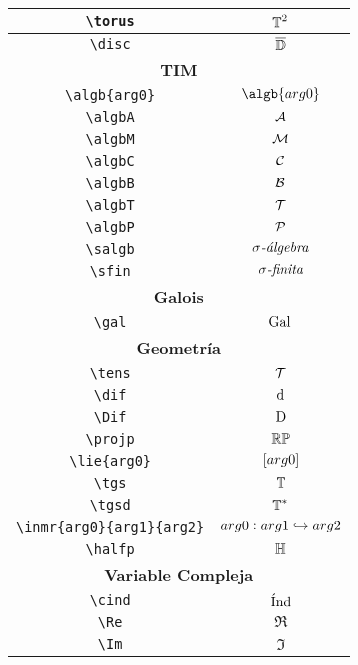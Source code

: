 \begin{longtable}{|c|c|}
\verb|\torus| & $\displaystyle\mathbb{T}^2$ \\ \midrule 
\verb|\disc| & $\displaystyle\overline{\mathbb{D}}$ \\ \midrule 
\bottomrule \multicolumn{2}{|c|}{\textbf{TIM}} \\ \toprule 
\verb|\algb{arg0}| & $\displaystyle\algb{arg0}$ \\ \midrule 
\verb|\algbA| & $\displaystyle\mathcal{A}$ \\ \midrule 
\verb|\algbM| & $\displaystyle\mathcal{M}$ \\ \midrule 
\verb|\algbC| & $\displaystyle\mathcal{C}$ \\ \midrule 
\verb|\algbB| & $\displaystyle\mathcal{B}$ \\ \midrule 
\verb|\algbT| & $\displaystyle\mathcal{T}$ \\ \midrule 
\verb|\algbP| & $\displaystyle\mathcal{P}$ \\ \midrule 
\verb|\salgb| & $\displaystyle\sigma \textit{-\'{a}lgebra}$ \\ \midrule 
\verb|\sfin| & $\displaystyle\sigma \textit{-finita}$ \\ \midrule 
\bottomrule \multicolumn{2}{|c|}{\textbf{Galois}} \\ \toprule 
\verb|\gal| & $\displaystyle\mathrm{Gal}\,$ \\ \midrule 
\bottomrule \multicolumn{2}{|c|}{\textbf{Geometría}} \\ \toprule 
\verb|\tens| & $\displaystyle\mathcal{T}$ \\ \midrule 
\verb|\dif| & $\displaystyle\operatorname{d\!}{}$ \\ \midrule 
\verb|\Dif| & $\displaystyle\operatorname{D\!}{}$ \\ \midrule 
\verb|\projp| & $\displaystyle\mathbb{RP}$ \\ \midrule 
\verb|\lie{arg0}| & $\displaystyle\left[arg0\right]$ \\ \midrule 
\verb|\tgs| & $\displaystyle\mathbb{T}$ \\ \midrule 
\verb|\tgsd| & $\displaystyle\mathbb{T}^*$ \\ \midrule 
\verb|\inmr{arg0}{arg1}{arg2}| & $\displaystyle arg0 : arg1 \hookrightarrow arg2$ \\ \midrule 
\verb|\halfp| & $\displaystyle\mathbb{H}$ \\ \midrule 
\bottomrule \multicolumn{2}{|c|}{\textbf{Variable Compleja}} \\ \toprule 
\verb|\cind| & $\displaystyle\operatorname{\acute{I}nd}$ \\ \midrule 
\verb|\Re| & $\displaystyle\Re$ \\ \midrule 
\verb|\Im| & $\displaystyle\Im$ \\ \midrule 

\end{longtable}
